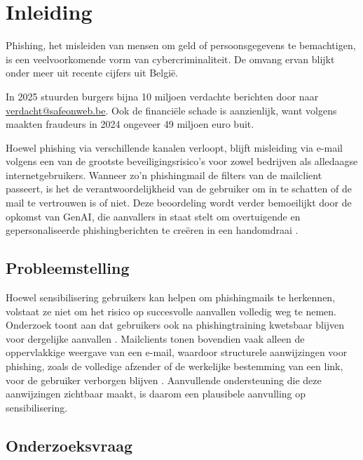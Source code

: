 
\chapter{Inleiding}
\label{ch:inleiding}

Phishing, het misleiden van mensen om geld of persoonsgegevens te bemachtigen, is een veelvoorkomende vorm van cybercriminaliteit. De omvang ervan blijkt onder meer uit recente cijfers uit België.

In 2025 stuurden burgers bijna 10 miljoen verdachte berichten door naar \url{verdacht@safeonweb.be}. Ook de financiële schade is aanzienlijk, want volgens \textcite{Febelfin2025} maakten fraudeurs in 2024 ongeveer 49 miljoen euro buit.

Hoewel phishing via verschillende kanalen verloopt, blijft misleiding via e-mail volgens \textcite{Veit2025} een van de grootste beveiligingsrisico's voor zowel bedrijven als alledaagse internetgebruikers. Wanneer zo'n phishingmail de filters van de mailclient passeert, is het de verantwoordelijkheid van de gebruiker om in te schatten of de mail te vertrouwen is of niet. Deze beoordeling wordt verder bemoeilijkt door de opkomst van GenAI, die aanvallers in staat stelt om overtuigende en gepersonaliseerde phishingberichten te creëren in een handomdraai \autocite{SchmittFlechais2024}.

\section{Probleemstelling}
\label{sec:probleemstelling}

Hoewel sensibilisering gebruikers kan helpen om phishingmails te herkennen, volstaat ze niet om het risico op succesvolle aanvallen volledig weg te nemen. Onderzoek toont aan dat gebruikers ook na phishing\-training kwetsbaar blijven voor dergelijke aanvallen \autocite{Marshall2024}. Mailclients tonen bovendien vaak alleen de oppervlakkige weergave van een e-mail, waardoor structurele aanwijzingen voor phishing, zoals de volledige afzender of de werkelijke bestemming van een link, voor de gebruiker verborgen blijven \autocite{Veit2025}. Aanvullende ondersteuning die deze aanwijzingen zichtbaar maakt, is daarom een plausibele aanvulling op sensibilisering.

\section{Onderzoeksvraag}
\label{sec:onderzoeksvraag}

